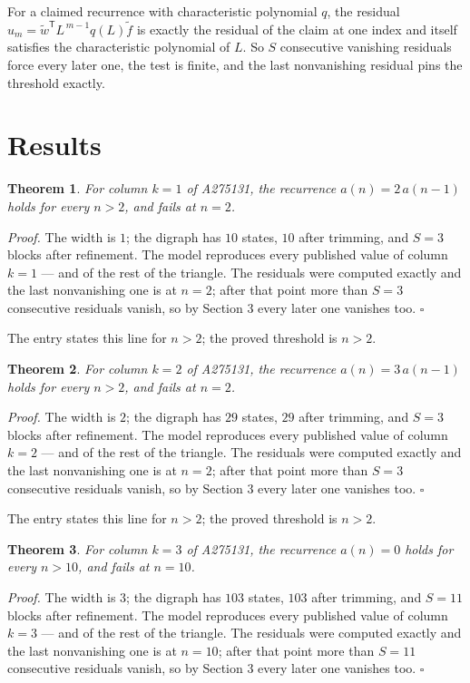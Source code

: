 \documentclass[11pt]{article}
\newtheorem{theorem}{Theorem}
\theoremstyle{definition}
\begin{document}
For a claimed recurrence with characteristic polynomial $q$, the residual $u_m = \tilde w^{\mathsf T}L^{\,m-1}q(L)\tilde f$ is exactly the residual of the claim at one index and itself satisfies the characteristic polynomial of $L$. So $S$ consecutive vanishing residuals force every later one, the test is finite, and the last nonvanishing residual pins the threshold exactly.

\section{Results}

\begin{theorem} For column $k = 1$ of A275131, the recurrence $a(n) = 2\,a(n-1)$ holds for every $n > 2$, and fails at $n = 2$.\end{theorem}

{\itshape Proof.} The width is $1$; the digraph has $10$ states, $10$ after trimming, and $S = 3$ blocks after refinement. The model reproduces every published value of column $k = 1$ --- and of the rest of the triangle. The residuals were computed exactly and the last nonvanishing one is at $n = 2$; after that point more than $S = 3$ consecutive residuals vanish, so by Section 3 every later one vanishes too. $\square$

The entry states this line for $n > 2$; the proved threshold is $n > 2$.

\begin{theorem} For column $k = 2$ of A275131, the recurrence $a(n) = 3\,a(n-1)$ holds for every $n > 2$, and fails at $n = 2$.\end{theorem}

{\itshape Proof.} The width is $2$; the digraph has $29$ states, $29$ after trimming, and $S = 3$ blocks after refinement. The model reproduces every published value of column $k = 2$ --- and of the rest of the triangle. The residuals were computed exactly and the last nonvanishing one is at $n = 2$; after that point more than $S = 3$ consecutive residuals vanish, so by Section 3 every later one vanishes too. $\square$

The entry states this line for $n > 2$; the proved threshold is $n > 2$.

\begin{theorem} For column $k = 3$ of A275131, the recurrence $a(n) = 0$ holds for every $n > 10$, and fails at $n = 10$.\end{theorem}

{\itshape Proof.} The width is $3$; the digraph has $103$ states, $103$ after trimming, and $S = 11$ blocks after refinement. The model reproduces every published value of column $k = 3$ --- and of the rest of the triangle. The residuals were computed exactly and the last nonvanishing one is at $n = 10$; after that point more than $S = 11$ consecutive residuals vanish, so by Section 3 every later one vanishes too. $\square$
\end{document}
